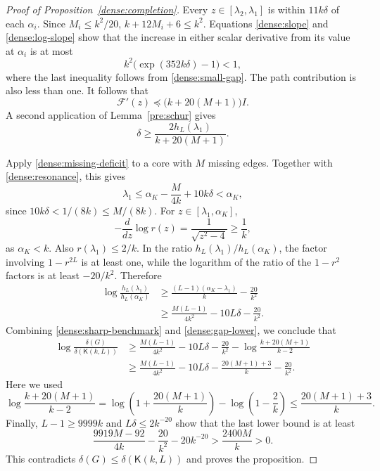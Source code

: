 \documentclass[11pt,a4paper]{article}
\numberwithin{equation}{section}
\theoremstyle{definition}
\theoremstyle{remark}
\newcommand{\Kite}{\mathsf{K}}
\begin{document}
\begin{proof}[Proof of Proposition~\ref{dense:completion}]
Every $z\in[\lambda_2,\lambda_1]$ is within $11k\delta$ of each
$\alpha_i$.  Since $M_i\le k^2/20$,
$k+12M_i+6\le k^2$.  Equations \eqref{dense:slope} and
\eqref{dense:log-slope} show that the increase in either scalar
derivative from its value at $\alpha_i$ is at most
\[
 k^2\bigl(\exp(352k\delta)-1\bigr)<1,
\]
where the last inequality follows from \eqref{dense:small-gap}.
The path contribution is also less than one.  It follows that
\begin{equation}\label{dense:sharp-matrix-slope}
 \mathcal F'(z)\preceq\bigl(k+20(M+1)\bigr)I.
\end{equation}
A second application of Lemma~\ref{pre:schur} gives
\begin{equation}\label{dense:gap-lower}
 \delta\ge\frac{2h_L(\lambda_1)}{k+20(M+1)}.
\end{equation}

Apply \eqref{dense:missing-deficit} to a core with $M$ missing edges.
Together with \eqref{dense:resonance}, this gives
\begin{equation}\label{dense:radius-loss}
 \lambda_1\le\alpha_K-\frac{M}{4k}+10k\delta<\alpha_K,
\end{equation}
since $10k\delta<1/(8k)\le M/(8k)$.
For $z\in[\lambda_1,\alpha_K]$,
\[
 -\frac{d}{dz}\log r(z)=\frac1{\sqrt{z^2-4}}\ge\frac1k,
\]
as $\alpha_K<k$.  Also $r(\lambda_1)\le2/k$.
In the ratio $h_L(\lambda_1)/h_L(\alpha_K)$, the factor involving
$1-r^{2L}$ is at least one, while the logarithm of the ratio of the
$1-r^2$ factors is at least $-20/k^2$.  Therefore
\begin{align*}
 \log\frac{h_L(\lambda_1)}{h_L(\alpha_K)}
 &\ge\frac{(L-1)(\alpha_K-\lambda_1)}{k}-\frac{20}{k^2}\\
 &\ge\frac{M(L-1)}{4k^2}-10L\delta-\frac{20}{k^2}.
\end{align*}
Combining \eqref{dense:sharp-benchmark} and
\eqref{dense:gap-lower}, we conclude that
\begin{align*}
 \log\frac{\delta(G)}{\delta(\Kite(k,L))}
 &\ge\frac{M(L-1)}{4k^2}-10L\delta-\frac{20}{k^2}
       -\log\frac{k+20(M+1)}{k-2}\\
 &\ge\frac{M(L-1)}{4k^2}-10L\delta
       -\frac{20(M+1)+3}{k}-\frac{20}{k^2}.
\end{align*}
Here we used
\[
 \log\frac{k+20(M+1)}{k-2}
 =\log\left(1+\frac{20(M+1)}k\right)
  -\log\left(1-\frac2k\right)
 \le\frac{20(M+1)+3}{k}.
\]
Finally, $L-1\ge9999k$ and $L\delta\le2k^{-20}$ show that the
last lower bound is at least
\[
 \frac{9919M-92}{4k}-\frac{20}{k^2}-20k^{-20}
 >\frac{2400M}{k}>0.
\]
This contradicts $\delta(G)\le\delta(\Kite(k,L))$ and proves the
proposition.
\end{proof}
\end{document}
